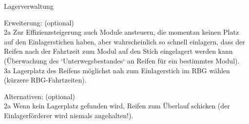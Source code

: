 \begin{function}{10}{Lagerverwaltung}
\begin{enumerate}
    \end{enumerate}
    \item[Erweiterung:] (optional)\\
        2a Zur Effizienzsteigerung auch Module ansteuern, die momentan keinen Platz auf
        den Einlagerstichen haben, aber wahrscheinlich so schnell einlagern, dass der
        Reifen nach der Fahrtzeit zum Modul auf den Stich eingelagert werden kann
        (Überwachung des `Unterwegsbestandes` an Reifen für ein bestimmtes
        Modul).\\
        3a Lagerplatz des Reifens möglichst nah zum Einlagerstich im RBG wählen	(kürzere RBG-Fahrtzeiten).
    \item[Alternativen:] (optional)\\
        2a Wenn kein Lagerplatz gefunden wird, Reifen zum Überlauf schicken (der
        Einlagerförderer wird niemals angehalten!).
\end{function}
\fi

